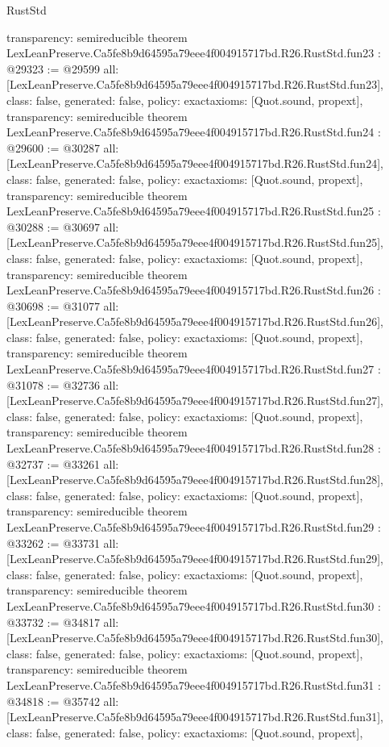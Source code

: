 \begin{lexlean}{RustStd}
\begin{coremodule}
{  transparency: semireducible
}
theorem LexLeanPreserve.Ca5fe8b9d64595a79eee4f004915717bd.R26.RustStd.fun23 : @29323 := @29599 {
  all: [LexLeanPreserve.Ca5fe8b9d64595a79eee4f004915717bd.R26.RustStd.fun23],
  class: false,
  generated: false,
  policy: exact{axioms: [Quot.sound, propext]},
  transparency: semireducible
}
theorem LexLeanPreserve.Ca5fe8b9d64595a79eee4f004915717bd.R26.RustStd.fun24 : @29600 := @30287 {
  all: [LexLeanPreserve.Ca5fe8b9d64595a79eee4f004915717bd.R26.RustStd.fun24],
  class: false,
  generated: false,
  policy: exact{axioms: [Quot.sound, propext]},
  transparency: semireducible
}
theorem LexLeanPreserve.Ca5fe8b9d64595a79eee4f004915717bd.R26.RustStd.fun25 : @30288 := @30697 {
  all: [LexLeanPreserve.Ca5fe8b9d64595a79eee4f004915717bd.R26.RustStd.fun25],
  class: false,
  generated: false,
  policy: exact{axioms: [Quot.sound, propext]},
  transparency: semireducible
}
theorem LexLeanPreserve.Ca5fe8b9d64595a79eee4f004915717bd.R26.RustStd.fun26 : @30698 := @31077 {
  all: [LexLeanPreserve.Ca5fe8b9d64595a79eee4f004915717bd.R26.RustStd.fun26],
  class: false,
  generated: false,
  policy: exact{axioms: [Quot.sound, propext]},
  transparency: semireducible
}
theorem LexLeanPreserve.Ca5fe8b9d64595a79eee4f004915717bd.R26.RustStd.fun27 : @31078 := @32736 {
  all: [LexLeanPreserve.Ca5fe8b9d64595a79eee4f004915717bd.R26.RustStd.fun27],
  class: false,
  generated: false,
  policy: exact{axioms: [Quot.sound, propext]},
  transparency: semireducible
}
theorem LexLeanPreserve.Ca5fe8b9d64595a79eee4f004915717bd.R26.RustStd.fun28 : @32737 := @33261 {
  all: [LexLeanPreserve.Ca5fe8b9d64595a79eee4f004915717bd.R26.RustStd.fun28],
  class: false,
  generated: false,
  policy: exact{axioms: [Quot.sound, propext]},
  transparency: semireducible
}
theorem LexLeanPreserve.Ca5fe8b9d64595a79eee4f004915717bd.R26.RustStd.fun29 : @33262 := @33731 {
  all: [LexLeanPreserve.Ca5fe8b9d64595a79eee4f004915717bd.R26.RustStd.fun29],
  class: false,
  generated: false,
  policy: exact{axioms: [Quot.sound, propext]},
  transparency: semireducible
}
theorem LexLeanPreserve.Ca5fe8b9d64595a79eee4f004915717bd.R26.RustStd.fun30 : @33732 := @34817 {
  all: [LexLeanPreserve.Ca5fe8b9d64595a79eee4f004915717bd.R26.RustStd.fun30],
  class: false,
  generated: false,
  policy: exact{axioms: [Quot.sound, propext]},
  transparency: semireducible
}
theorem LexLeanPreserve.Ca5fe8b9d64595a79eee4f004915717bd.R26.RustStd.fun31 : @34818 := @35742 {
  all: [LexLeanPreserve.Ca5fe8b9d64595a79eee4f004915717bd.R26.RustStd.fun31],
  class: false,
  generated: false,
  policy: exact{axioms: [Quot.sound, propext]},
}
\end{coremodule}
\end{lexlean}
